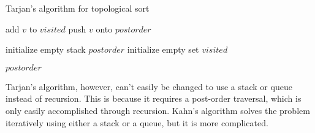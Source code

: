 \documentclass{article}
\begin{document}
\begin{algorithm}[H]
\caption{Tarjan's algorithm for topological sort}
\begin{algorithmic}

    \State add $v$ to $visited$
            \State {}
        \EndIf
    \EndFor
    \State push $v$ onto $postorder$
\EndFunction

    \State initialize empty stack $postorder$
    \State initialize empty set $visited$
    
            \State {}
        \EndIf
    \EndFor
    
    \State \Return $postorder$
\EndFunction

\end{algorithmic}
\end{algorithm}

Tarjan's algorithm, however, can't easily be changed to use a stack or queue instead of recursion. This is because it requires a post-order traversal, which is only easily accomplished through recursion. Kahn's algorithm solves the problem iteratively using either a stack or a queue, but it is more complicated.
\end{document}
